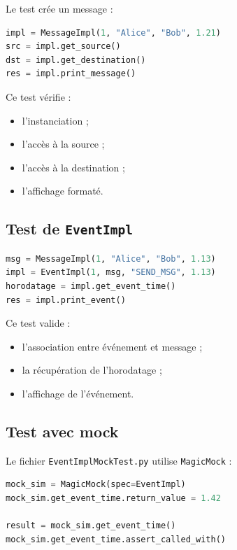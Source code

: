 \documentclass{article}
\begin{document}
Le test crée un message :

\begin{lstlisting}[language=Python, caption=Création d'un message]
impl = MessageImpl(1, "Alice", "Bob", 1.21)
src = impl.get_source()
dst = impl.get_destination()
res = impl.print_message()
\end{lstlisting}

Ce test vérifie :
\begin{itemize}[leftmargin=*]
    \item l’instanciation ;
    \item l’accès à la source ;
    \item l’accès à la destination ;
    \item l’affichage formaté.
\end{itemize}

\subsection{Test de \texttt{EventImpl}}

\begin{lstlisting}[language=Python, caption=Test de EventImpl]
msg = MessageImpl(1, "Alice", "Bob", 1.13)
impl = EventImpl(1, msg, "SEND_MSG", 1.13)
horodatage = impl.get_event_time()
res = impl.print_event()
\end{lstlisting}

Ce test valide :
\begin{itemize}[leftmargin=*]
    \item l’association entre événement et message ;
    \item la récupération de l’horodatage ;
    \item l’affichage de l’événement.
\end{itemize}

\subsection{Test avec mock}

Le fichier \texttt{EventImplMockTest.py} utilise \texttt{MagicMock} :

\begin{lstlisting}[language=Python, caption=Utilisation de MagicMock]
mock_sim = MagicMock(spec=EventImpl)
mock_sim.get_event_time.return_value = 1.42

result = mock_sim.get_event_time()
mock_sim.get_event_time.assert_called_with()
\end{lstlisting}
\end{document}
